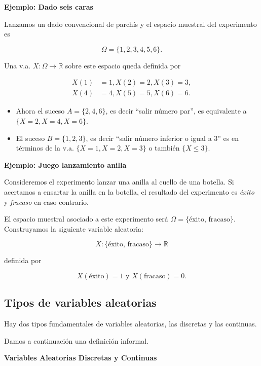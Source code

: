 \documentclass[
  letterpaper,
  DIV=11,
  numbers=noendperiod]{scrreprt}
\providecommand{\tightlist}{%
  \setlength{\itemsep}{0pt}\setlength{\parskip}{0pt}}\usepackage{longtable,booktabs,array}
\begin{document}
\textbf{Ejemplo: Dado seis caras}

Lanzamos un dado convencional de parchís y el espacio muestral del
experimento es

\[\Omega=\{1,2, 3, 4,  5, 6\}.\]

Una v.a. \(X:\Omega\to\mathbb{R}\) sobre este espacio queda definida por

\begin{equation*}
\begin{split}
X(1)&=1,X(2)=2,X(3)=3,\\
X(4)&=4,X(5)=5,X(6)=6.
\end{split}
\end{equation*}

\begin{itemize}
\tightlist
\item
  Ahora el suceso \(A=\{2, 4, 6\}\), es decir ``salir número par'', es
  equivalente a \(\{X=2,X=4,X=6\}\).
\item
  El suceso \(B=\{1,2,3\}\), es decir ``salir número inferior o igual a
  \(3\)'' es en términos de la v.a. \(\{X=1,X=2,X=3\}\) o también
  \(\{X\leq 3\}\).
\end{itemize}

\textbf{Ejemplo: Juego lanzamiento anilla}

Consideremos el experimento lanzar una anilla al cuello de una botella.
Si acertamos a ensartar la anilla en la botella, el resultado del
experimento es \emph{éxito} y \emph{fracaso} en caso contrario.

El espacio muestral asociado a este experimento será
\(\Omega=\{\mbox{éxito, fracaso}\}\). Construyamos la siguiente variable
aleatoria:

\[X:\{\mbox{éxito, fracaso}\}\to\mathbb{R}\]

definida por

\[X(\mbox{éxito})=1 \mbox{ y } X(\mbox{fracaso})=0.\]

\hypertarget{tipos-de-variables-aleatorias}{%
\subsection{Tipos de variables
aleatorias}\label{tipos-de-variables-aleatorias}}

Hay dos tipos fundamentales de variables aleatorias, las discretas y las
continuas.

Damos a continuación una definición informal.

\textbf{Variables Aleatorias Discretas y Continuas}
\end{document}

